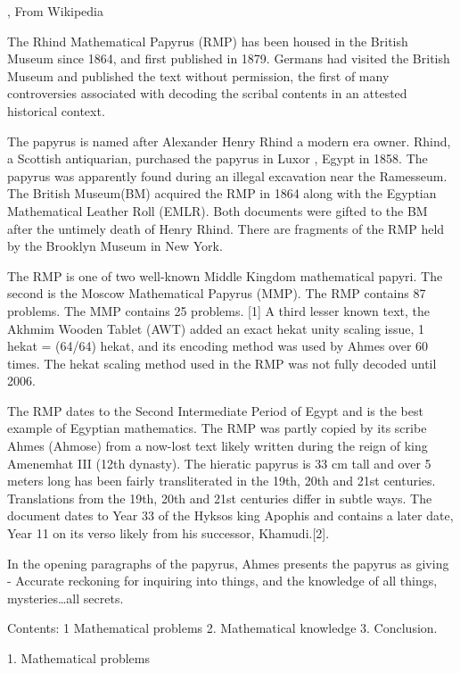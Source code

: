 \documentclass[12pt]{article}
\begin{document}
, 
From Wikipedia

The Rhind Mathematical Papyrus (RMP) has been housed in the British Museum since 1864, and first published in 1879. Germans had visited the British Museum and published the text without permission, the first of many controversies associated with decoding the scribal contents in an attested historical context. 

The papyrus is named after Alexander Henry Rhind a modern era owner.  Rhind, a Scottish antiquarian, purchased the papyrus in Luxor , Egypt in 1858. The papyrus was apparently found during an illegal excavation near the Ramesseum. The British Museum(BM) acquired the RMP in 1864 along with the Egyptian Mathematical Leather Roll (EMLR). Both documents were gifted to the BM after the untimely death of Henry Rhind. There are fragments of the RMP held by the Brooklyn Museum in New York. 

The RMP is one of two well-known Middle Kingdom mathematical papyri. The second is the Moscow Mathematical Papyrus (MMP). The RMP contains 87 problems. The MMP contains 25 problems. [1] A third lesser known text, the Akhmim Wooden Tablet (AWT) added an exact hekat unity scaling issue, 1 hekat = (64/64) hekat, and its encoding method was used by Ahmes over 60 times. The hekat scaling method used in the RMP was not fully decoded until 2006.

The RMP dates to the Second Intermediate Period of Egypt and is the best example of Egyptian mathematics. The RMP was partly copied by its scribe Ahmes  (Ahmose) from  a now-lost text likely written during the reign of king Amenemhat III (12th dynasty). The hieratic papyrus is 33 cm tall and over 5 meters long has been fairly transliterated in the 19th, 20th and 21st centuries. Translations from the 19th, 20th and 21st centuries differ in subtle ways.
The document dates to Year 33 of the Hyksos king Apophis and contains a later date, Year 11 on its verso likely from his successor, Khamudi.[2].

In the opening paragraphs of the papyrus, Ahmes presents the papyrus as giving - Accurate reckoning for inquiring into things, and the knowledge of all things, mysteries…all secrets.

Contents: 1 Mathematical problems 2. Mathematical knowledge 3. Conclusion.

1. Mathematical problems
\end{document}
